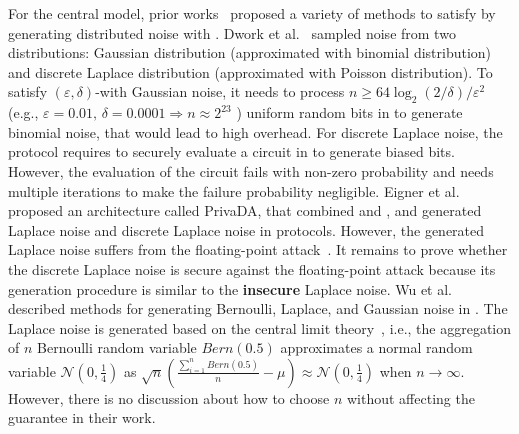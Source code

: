 For the central \differentialprivacy model, prior works~\cite{dwork2006our, eigner2014differentially,wu2016inherit,jayaraman2018distributed,knott2021crypten,yuan2021practical,eriguchi2021efficient} proposed a variety of methods to satisfy \differentialprivacy by generating distributed noise with \smpc.
Dwork et al.~\cite{dwork2006our} sampled noise from two distributions: Gaussian distribution (approximated with binomial distribution) and discrete Laplace distribution (approximated with Poisson distribution).
To satisfy $\left(\varepsilon ,\delta \right) $-\differentialprivacy with Gaussian noise, it needs to process $n\geq 64 \log_2{\left(2/\delta \right) }/\varepsilon ^2$ (e.g., $\varepsilon =0.01 \text{, }\delta=0.0001\Rightarrow n\approx 2^{23}$ ) uniform random bits in \smpc to generate binomial noise, that would lead to high \smpc overhead.
For discrete Laplace noise, the protocol requires to securely evaluate a circuit in \smpc to generate biased bits. However, the evaluation of the circuit fails with non-zero probability and needs multiple iterations to make the failure probability negligible.
Eigner et al.~\cite{eigner2014differentially} proposed an architecture called PrivaDA, that combined \differentialprivacy and \smpc, and generated Laplace noise and discrete Laplace noise in \smpc protocols. However, the generated Laplace noise suffers from the floating-point attack~\cite{mironov2012significance}. It remains to prove whether the discrete Laplace noise is secure against the floating-point attack because its generation procedure is similar to the \textbf{insecure} Laplace noise.
Wu et al.~\cite{wu2016inherit} described methods for generating Bernoulli, Laplace, and Gaussian noise in \smpc. The Laplace noise is generated based on the central limit theory~\cite[Example 10.3.2]{athreya2006measure}, i.e., the aggregation of $n$ Bernoulli random variable $Bern\left(0.5\right)$ approximates a normal random variable $\mathcal{N} \left(0,\frac{1}{4}\right)$ as $\sqrt{n}\left(\frac{\sum_{i = 1}^{n}  Bern\left(0.5\right) }{n}-\mu\right) \approx \mathcal{N} \left(0,\frac{1}{4}\right)   $ when $n \rightarrow \infty $. However, there is no discussion about how to choose $n$ without affecting the \differentialprivacy guarantee in their work.

